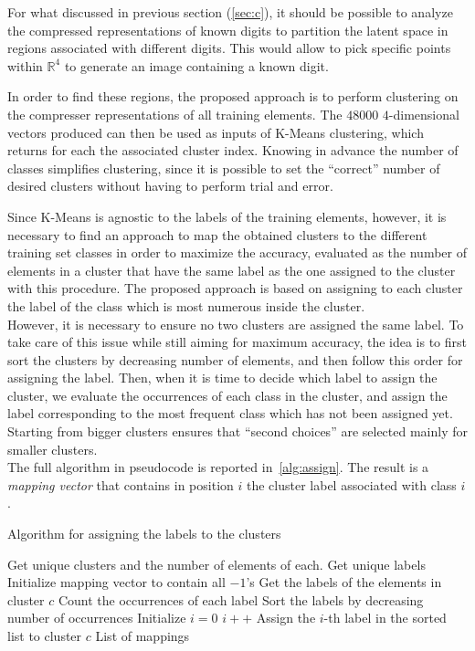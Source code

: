 \documentclass[12pt]{article}
\begin{document}
For what discussed in previous section (\ref{sec:c}), it should be possible to analyze the compressed representations of known digits to partition the latent space in regions associated with different digits.
This would allow to pick specific points within $\mathbb{R}^4$ to generate an image containing a known digit.

In order to find these regions, the proposed approach is to perform clustering on the compresser representations of all training elements.
The $48000$ $4$-dimensional vectors produced can then be used as inputs of K-Means clustering, which returns for each the associated cluster index.
Knowing in advance the number of classes simplifies clustering, since it is possible to set the ``correct'' number of desired clusters without having to perform trial and error.

Since K-Means is agnostic to the labels of the training elements, however, it is necessary to find an approach to map the obtained clusters to the different training set classes in order to maximize the accuracy, evaluated as the number of elements in a cluster that have the same label as the one assigned to the cluster with this procedure.
The proposed approach is based on assigning to each cluster the label of the class which is most numerous inside the cluster.\\
However, it is necessary to ensure no two clusters are assigned the same label.
To take care of this issue while still aiming for maximum accuracy, the idea is to first sort the clusters by decreasing number of elements, and then follow this order for assigning the label.
Then, when it is time to decide which label to assign the cluster, we evaluate the occurrences of each class in the cluster, and assign the label corresponding to the most frequent class which has not been assigned yet.
Starting from bigger clusters ensures that ``second choices'' are selected mainly for smaller clusters.\\
The full algorithm in pseudocode is reported in\ \ref{alg:assign}.
The result is a \textit{mapping vector} that contains in position $i$ the cluster label associated with class $i$.

\begin{algorithm}
  \caption{Algorithm for assigning the labels to the clusters}\label{alg:assign}
  \begin{algorithmic}
    \State Get unique clusters and the number of elements of each.
    \State Get unique labels
    \State Initialize mapping vector to contain all $-1$'s
      \State Get the labels of the elements in cluster $c$
      \State Count the occurrences of each label
      \State Sort the labels by decreasing number of occurrences
      \State Initialize $i = 0$
        \State $i++$
      \EndWhile
      \State Assign the $i$-th label in the sorted list to cluster $c$
    \EndFor
    \State
    \Return List of mappings
  \end{algorithmic}
\end{algorithm}
\end{document}
